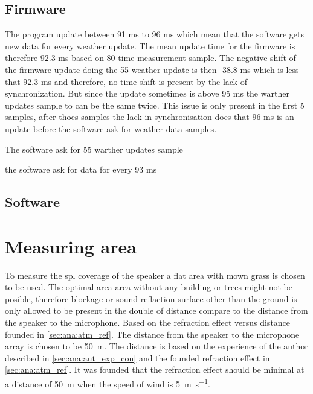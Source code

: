 
\subsection{Firmware}






The program update between 91 ms to 96 ms which mean that the software gets new data for every weather update. The mean update time for the firmware is therefore 92.3 ms based on 80 time measurement sample.  The negative shift of the firmware update doing the 55 weather update is then -38.8 ms which is less that 92.3 ms and therefore, no time shift is present by the lack of synchronization. But since the update sometimes is above 95 ms the warther updates sample to \matlab can be the same twice. This issue is only present in the first 5 samples, after thoes samples the lack in synchronisation does that 96 ms is an update before the software ask for weather data samples. 

The software ask for 55 warther updates sample 



the software ask for data for every 93 ms

\subsection{Software}





\section{Measuring area}
To measure the \gls{spl} coverage of the speaker a flat area with mown grass is chosen to be used. The optimal area area without any building or trees might not be posible, therefore blockage or sound reflaction surface other than the ground is only allowed to be present in the double of distance compare to the distance from the speaker to the microphone. Based on the refraction effect versus distance founded in \autoref{sec:ana:atm_ref}. The distance from the speaker to the microphone array is chosen to be \SI{50}{\meter}. The distance is based on the experience of the author described in \autoref{sec:ana:aut_exp_con} and the founded refraction effect in \autoref{sec:ana:atm_ref}. It was founded that the refraction effect should be minimal at a distance of \SI{50}{\meter} when the speed of wind is \SI{5}{\meter\per\second}. 


